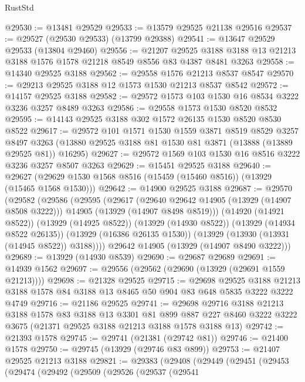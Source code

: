 \begin{lexlean}{RustStd}
\begin{coremodule}
@29530 := @13481 @29529
@29533 := @13579 @29525 @21138 @29516
@29537 := @29527 (@29530 @29533) (@13799 @29388)
@29541 := @13647 @29529 @29533 (@13804 @29460)
@29556 := @21207
    @29525
    @3188
    @3188
    @13
    @21213
    @3188
    @1576
    @1578
    @21218
    @8549
    @8556
    @83
    @4387
    @8481
    @3263
@29558 := @14340 @29525 @3188
@29562 := @29558 @1576 @21213 @8537 @8547
@29570 := @29213 @29525 @3188 @12 @1573 @1530 @21213 @8537 @8542
@29572 := @14157 @29525 @3188
@29582 := @29572 @1573 @103 @1530 @16 @8534 @3222 @3236 @3257 @8489 @3263
@29586 := @29558 @1573 @1530 @8520 @8532
@29595 := @14143 @29525 @3188 @302 @1572 @26135 @1530 @8520 @8530 @8522
@29617 := @29572
    @101
    @1571
    @1530
    @1559
    @3871
    @8519
    @8529
    @3257
    @8497
    @3263
    (@13880 @29525 @3188 @81 @1530 @81 @3871 (@13888 (@13889 @29525 @81)) @16295)
@29627 := @29572 @1569 @103 @1530 @16 @8516 @3222 @3236 @3257 @8507 @3263
@29629 := @15451 @29525 @3188
@29640 := @29627 (@29629 @1530 @1568 @8516 (@15459 (@15460 @8516)) (@13929 (@15465 @1568 @1530)))
@29642 := @14900 @29525 @3188
@29687 := @29570
    (@29582
      (@29586
        (@29595
          (@29617
            (@29640 @29642 @14905 (@13929 (@14907 @8508 @3222)))
            @14905
            (@13929 (@14907 @8498 @8519)))
          (@14920 (@14921 @8522))
          (@13929 (@14925 @8522))
          (@13929 (@14930 @8522))
          (@13929 (@14934 @8522 @26135))
          (@13929 (@16386 @26135 @1530))
          (@13929 (@13930 (@13931 (@14945 @8522)) @3188))))
      @29642
      @14905
      (@13929 (@14907 @8490 @3222)))
@29689 := @13929 (@14930 @8539)
@29690 := @29687 @29689
@29691 := @14939 @1562
@29697 := @29556 (@29562 (@29690 (@13929 (@29691 @1559 @21213))))
@29698 := @21328 @29525
@29715 := @29698
    @29525
    @3188
    @21213
    @3188
    @1578
    @84
    @3188
    @13
    @8465
    @50
    @904
    @83
    @648
    @5835
    @3222
    @3222
    @4749
@29716 := @21186 @29525
@29741 := @29698
    @29716
    @3188
    @21213
    @3188
    @1578
    @83
    @3188
    @13
    @3301
    @81
    @899
    @887
    @227
    @8460
    @3222
    @3222
    @3675
    (@21371 @29525 @3188 @21213 @3188 @1578 @3188 @13)
@29742 := @21393 @1578
@29745 := @29741 (@21381 (@29742 @81))
@29746 := @21400 @1578
@29750 := @29745 (@13929 (@29746 @83 @899))
@29753 := @21407 @29525 @21213 @3188
@29821 := @29383
    (@29408
      (@29449
        (@29451
          (@29453
            (@29474
              (@29492
                (@29509
                  (@29526
                    (@29537
                      (@29541

\end{coremodule}
\end{lexlean}
